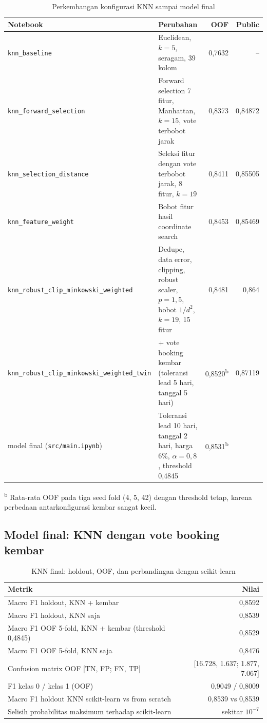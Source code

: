 \begin{table}[H]
\centering
\caption{Perkembangan konfigurasi KNN sampai model final}
\label{tab:knn_progres}
\begin{tabularx}{\textwidth}{>{\raggedright\arraybackslash}p{4.6cm}X rr}
\toprule
Notebook & Perubahan & OOF & Public \\
\midrule
\texttt{knn\_baseline} & Euclidean, $k=5$, seragam, 39 kolom & 0,7632 & -- \\
\texttt{knn\_forward\_selection} & Forward selection 7 fitur, Manhattan, $k=15$, vote terbobot jarak & 0,8373 & 0,84872 \\
\texttt{knn\_selection\_distance} & Seleksi fitur dengan vote terbobot jarak, 8 fitur, $k=19$ & 0,8411 & 0,85505 \\
\texttt{knn\_feature\_weight} & Bobot fitur hasil coordinate search & 0,8453 & 0,85469 \\
\texttt{knn\_robust\_clip\_minkowski\_weighted} & Dedupe, data error, clipping, robust scaler, $p=1{,}5$, bobot $1/d^2$, $k=19$, 15 fitur & 0,8481 & 0,864 \\
\texttt{knn\_robust\_clip\_minkowski\_weighted\_twin} & + vote booking kembar (toleransi lead 5 hari, tanggal 5 hari) & 0,8520\textsuperscript{b} & 0,87119 \\
model final (\texttt{src/main.ipynb}) & Toleransi lead 10 hari, tanggal 2 hari, harga 6\%, $\alpha=0{,}8$, threshold 0,4845 & 0,8531\textsuperscript{b} & \todo{} \\
\bottomrule
\end{tabularx}

\raggedright\footnotesize \textsuperscript{b} Rata-rata OOF pada tiga seed fold (4, 5, 42) dengan threshold tetap, karena perbedaan antarkonfigurasi kembar sangat kecil.
\end{table}

\subsection{Model final: KNN dengan vote booking kembar}

\begin{table}[H]
\centering
\caption{KNN final: holdout, OOF, dan perbandingan dengan scikit-learn}
\label{tab:knn_final}
\begin{tabular}{lr}
\toprule
Metrik & Nilai \\
\midrule
Macro F1 holdout, KNN + kembar & 0,8592 \\
Macro F1 holdout, KNN saja & 0,8539 \\
Macro F1 OOF 5-fold, KNN + kembar (threshold 0,4845) & 0,8529 \\
Macro F1 OOF 5-fold, KNN saja & 0,8476 \\
Confusion matrix OOF [TN, FP; FN, TP] & [16.728, 1.637; 1.877, 7.067] \\
F1 kelas 0 / kelas 1 (OOF) & 0,9049 / 0,8009 \\
Macro F1 holdout KNN scikit-learn vs from scratch & 0,8539 vs 0,8539 \\
Selisih probabilitas maksimum terhadap scikit-learn & sekitar $10^{-7}$ \\
\bottomrule
\end{tabular}
\end{table}

